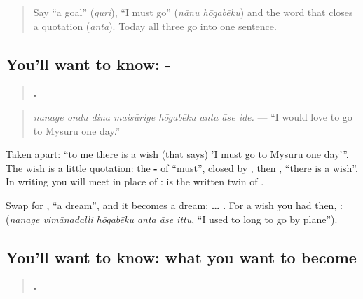 \label{lesson:KA-C315-hogabeku-anta-ase}



\begin{quote}
Say \textquotedblleft{}a goal\textquotedblright{} (\emph{guri}), \textquotedblleft{}I must go\textquotedblright{} (\emph{nānu hōgabēku}) and the word that closes a quotation (\emph{anta}). Today all three go into one sentence.
\end{quote}

\subsection*{You'll want to know: -   }
\begin{quote}
\textbf{       .}
\end{quote}

\begin{quote}
\emph{nanage ondu dina maisūrige hōgabēku anta āse ide.} — \textquotedblleft{}I would love to go to Mysuru one day.\textquotedblright{}
\end{quote}

Taken apart: \textquotedblleft{}to me there is a wish (that says) 'I must go to Mysuru one day'\textquotedblright{}. The wish is a little quotation: the \textbf{-} of \textquotedblleft{}must\textquotedblright{}, closed by \textbf{}, then \textbf{ }, \textquotedblleft{}there is a wish\textquotedblright{}. In writing you will meet \textbf{} in place of \textbf{ }: \textbf{} is the written twin of \textbf{}.

Swap \textbf{} for \textbf{}, \textquotedblleft{}a dream\textquotedblright{}, and it becomes a dream: \textbf{…   }. For a wish you had then, \textbf{}: \textbf{     } (\emph{nanage vimānadalli hōgabēku anta āse ittu}, \textquotedblleft{}I used to long to go by plane\textquotedblright{}).

\subsection*{You'll want to know: what you want to become}
\begin{quote}
\textbf{      .}
\end{quote}

